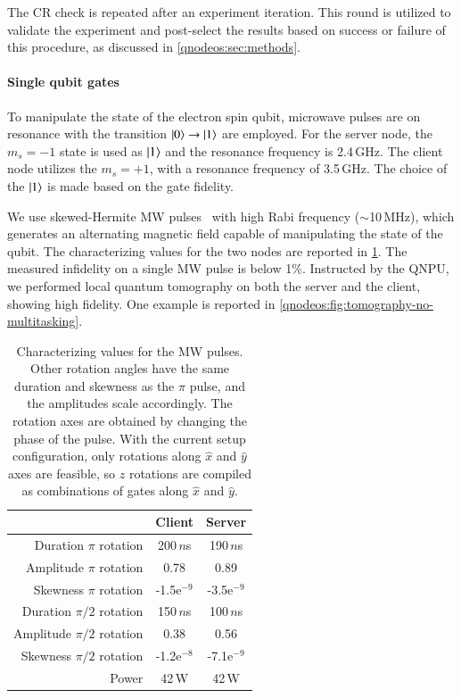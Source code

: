 The \ac{CR} check is repeated after an experiment iteration. This round is utilized to validate the experiment and post-select the results based on success or failure of this procedure, as discussed in \cref{qnodeos:sec:methods}.

\paragraph{Single qubit gates}

To manipulate the state of the electron spin qubit, microwave pulses are on resonance with the transition $\ket{0}\rightarrow\ket{1}$ are employed. For the server node, the $m_s=-1$ state is used as $\ket{1}$ and the resonance frequency is 2.4\,GHz. The client node utilizes the $m_s=+1$, with a resonance frequency of 3.5\,GHz. The choice of the $\ket{1}$ is made based on the gate fidelity.

We use skewed-Hermite \acf{MW} pulses~\cite{warren_1984,vandersypen_2005} with high Rabi frequency ($\sim$10\,MHz), which generates an alternating magnetic field capable of manipulating the state of the qubit. The characterizing values for the two nodes are reported in \cref{tab:mw_pulse}. The measured infidelity on a single \ac{MW} pulse is below 1\%. Instructed by the \ac{QNPU}, we performed local quantum tomography on both the server and the client, showing high fidelity. One example is reported in \cref{qnodeos:fig:tomography-no-multitasking}.

\begin{table}[]
    \centering
    \begin{tabular}{|r|c|c|}
    \hline
 &Client & Server\\
\hline
        Duration $\pi$ rotation & 200\,$n$s & 190\,$n$s\\
        Amplitude $\pi$ rotation & 0.78 & 0.89\\
        Skewness $\pi$ rotation & -1.5e$^{-9}$ & -3.5e$^{-9}$\\
        Duration $\pi/2$ rotation & 150\,$n$s&  100\,$n$s\\
        Amplitude $\pi/2$ rotation & 0.38 & 0.56\\
        Skewness $\pi/2$ rotation & -1.2e$^{-8}$& -7.1e$^{-9}$ \\
        Power & 42\,W & 42\,W\\
        \hline
    \end{tabular}
    \caption{Characterizing values for the \ac{MW} pulses. Other rotation angles have the same duration and skewness as the $\pi$ pulse, and the amplitudes scale accordingly. The rotation axes are obtained by changing the phase of the pulse. With the current setup configuration, only rotations along $\hat{x}$ and $\hat{y}$ axes are feasible, so $\hat{z}$ rotations are compiled as combinations of gates along $\hat{x}$ and $\hat{y}$.}
    \label{tab:mw_pulse}
\end{table}

